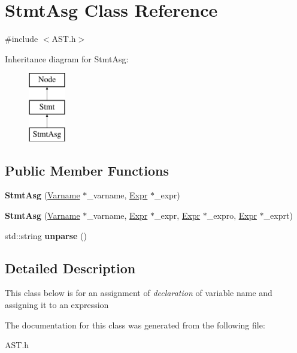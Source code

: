 \hypertarget{classStmtAsg}{\section{Stmt\-Asg Class Reference}
\label{classStmtAsg}
}


{\ttfamily \#include $<$A\-S\-T.\-h$>$}

Inheritance diagram for Stmt\-Asg\-:\begin{figure}[H]
\begin{center}
\leavevmode
\includegraphics[height=3.000000cm]{classStmtAsg}
\end{center}
\end{figure}
\subsection*{Public Member Functions}
\begin{DoxyCompactItemize}
\item 
\hypertarget{classStmtAsg_a3ba115f325b431815e67cc119445af5d}{{\bfseries Stmt\-Asg} (\hyperlink{classVarname}{Varname} $\ast$\-\_\-varname, \hyperlink{classExpr}{Expr} $\ast$\-\_\-expr)}\label{classStmtAsg_a3ba115f325b431815e67cc119445af5d}

\item 
\hypertarget{classStmtAsg_adec83a1cf5010bdc7863806bd07deb9d}{{\bfseries Stmt\-Asg} (\hyperlink{classVarname}{Varname} $\ast$\-\_\-varname, \hyperlink{classExpr}{Expr} $\ast$\-\_\-expr, \hyperlink{classExpr}{Expr} $\ast$\-\_\-expro, \hyperlink{classExpr}{Expr} $\ast$\-\_\-exprt)}\label{classStmtAsg_adec83a1cf5010bdc7863806bd07deb9d}

\item 
\hypertarget{classStmtAsg_a2a25fa8011c5b33be014e0c1c56bd4d6}{std\-::string {\bfseries unparse} ()}\label{classStmtAsg_a2a25fa8011c5b33be014e0c1c56bd4d6}

\end{DoxyCompactItemize}


\subsection{Detailed Description}
This class below is for an assignment of {\itshape declaration} of variable name and assigning it to an expression 

The documentation for this class was generated from the following file\-:\begin{DoxyCompactItemize}
\item 
A\-S\-T.\-h\end{DoxyCompactItemize}
